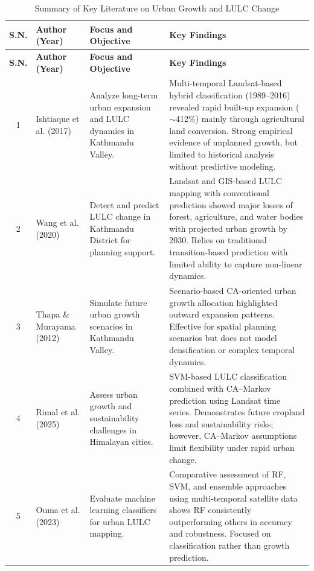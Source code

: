 \documentclass[main]{subfiles}
\begin{document}
\begin{longtable}{|c|p{2.8cm}|p{4.2cm}|p{5cm}|}
\caption{Summary of Key Literature on Urban Growth and LULC Change}
\label{tab:literature_summary} \\

\hline
\textbf{S.N.} &
\textbf{Author (Year)} &
\textbf{Focus and Objective} &
\textbf{Key Findings} \\
\hline
\endfirsthead

\hline
\textbf{S.N.} &
\textbf{Author (Year)} &
\textbf{Focus and Objective} &
\textbf{Key Findings} \\
\hline
\endhead

1 &
Ishtiaque et al. (2017)~\cite{environments4040072} &
Analyze long-term urban expansion and LULC dynamics in Kathmandu Valley. &
Multi-temporal Landsat-based hybrid classification (1989--2016) revealed rapid built-up expansion (\(\sim\)412\%) mainly through agricultural land conversion. Strong empirical evidence of unplanned growth, but limited to historical analysis without predictive modeling. \\
\hline

2 &
Wang et al. (2020)~\cite{wang2020land} &
Detect and predict LULC change in Kathmandu District for planning support. &
Landsat and GIS-based LULC mapping with conventional prediction showed major losses of forest, agriculture, and water bodies with projected urban growth by 2030. Relies on traditional transition-based prediction with limited ability to capture non-linear dynamics. \\
\hline

3 &
Thapa \& Murayama (2012)~\cite{thapa2012scenario} &
Simulate future urban growth scenarios in Kathmandu Valley. &
Scenario-based CA-oriented urban growth allocation highlighted outward expansion patterns. Effective for spatial planning scenarios but does not model densification or complex temporal dynamics. \\
\hline

4 &
Rimal et al. (2025)~\cite{rimal2025} &
Assess urban growth and sustainability challenges in Himalayan cities. &
SVM-based LULC classification combined with CA--Markov prediction using Landsat time series. Demonstrates future cropland loss and sustainability risks; however, CA--Markov assumptions limit flexibility under rapid urban change. \\
\hline

5 &
Ouma et al. (2023)~\cite{Ouma31122023} &
Evaluate machine learning classifiers for urban LULC mapping. &
Comparative assessment of RF, SVM, and ensemble approaches using multi-temporal satellite data shows RF consistently outperforming others in accuracy and robustness. Focused on classification rather than growth prediction. \\
\hline


\end{longtable}
\end{document}
